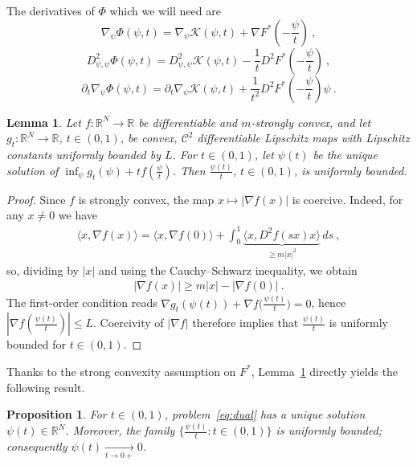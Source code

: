 \documentclass{scrartcl}
\newcommand{\R}{{\mathbb R}}
\theoremstyle{plain}
\newtheorem{lem}[thm]{Lemma}
\newtheorem{prop}[thm]{Proposition}
\theoremstyle{definition}
\begin{document}
The derivatives of $\Phi$ which we will need  are
\begin{equation}\label{eqn: gradient of Phi}
    \nabla_\psi\Phi(\psi,t) = \nabla_\psi\mathcal{K}(\psi,t) + \nabla F^*\left(-\frac{\psi}{t}\right)\ ,
\end{equation}
\begin{equation}\label{eqn: Hessian of Phi}
    D^2_{\psi,\psi}\Phi(\psi,t) = D^2_{\psi,\psi}\mathcal{K}(\psi,t) - \frac{1}{t}D^2F^*\left(-\frac{\psi}{t}\right)\ ,
\end{equation}
\begin{equation}\label{eqn: mixed second of Phi}
    \partial_t\nabla_\psi\Phi(\psi,t) = \partial_t\nabla_\psi\mathcal{K}(\psi,t) +\frac{1}{t^2} D^2F^*\left(-\frac{\psi}{t}\right)\psi\ .
\end{equation}

\begin{lem}\label{lem:uniformly_bounded_solutions}
    Let $f : \R^N\to\R$ be differentiable and $m$-strongly convex, and let $g_t:\R^N\to\R$, $t\in(0,1)$, be convex, $\mathcal{C}^2$ differentiable Lipschitz maps with Lipschitz constants uniformly bounded by $L$. For $t\in(0,1)$, let $\psi(t)$ be the unique solution of $\inf_{\psi} g_t(\psi)+tf(\frac{\psi}{t})$. Then $\frac{\psi(t)}{t}$, $t\in(0,1)$, is uniformly bounded.
\end{lem}

\begin{proof}
    Since $f$ is strongly convex, the map $x\mapsto |\nabla f(x)|$ is coercive. Indeed, for any $x\neq0$ we have
    \begin{align*}
    \langle x,\nabla f(x)\rangle = \langle x,\nabla f(0)\rangle + \int_0^1 \underbrace{ \langle x,D^2f(sx)x\rangle}_{\geq m|x|^2}\,ds\ ,
    \end{align*}
    so, dividing by $|x|$ and using the Cauchy--Schwarz inequality, we obtain
    \begin{align*}
    |\nabla f(x)| \geq m|x| - |\nabla f(0)|\ .
    \end{align*}
    The first-order condition reads $\nabla g_t(\psi(t)) + \nabla f\big(\frac{\psi(t)}{t}\big)=0$, hence $|\nabla f(\frac{\psi(t)}{t})|\leq L$. Coercivity of $|\nabla f|$ therefore implies that $\frac{\psi(t)}{t}$ is uniformly bounded for $t\in(0,1)$.
\end{proof}

Thanks to the strong convexity assumption on $F^*$, Lemma~\ref{lem:uniformly_bounded_solutions} directly yields the following result.
\begin{prop}\label{prop:bounded_nu}
    For $t\in(0,1)$, problem~\eqref{eq:dual} has a unique solution $\psi(t)\in\R^N$. Moreover, the family $\{\frac{\psi(t)}{t}: t\in(0,1)\}$ is uniformly bounded; consequently $\psi(t) \xrightarrow[t\to0+]{}0$.
\end{prop}
\end{document}
